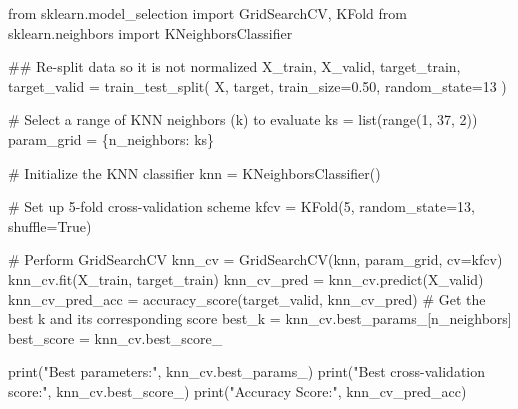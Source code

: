 \documentclass[
  11pt,
  letterpaper,
  DIV=11,
  numbers=noendperiod]{scrartcl}
\newenvironment{Shaded}{\begin{snugshade}}{\end{snugshade}}
\newcommand{\BuiltInTok}[1]{\textcolor[rgb]{0.00,0.23,0.31}{#1}}
\newcommand{\CommentTok}[1]{\textcolor[rgb]{0.37,0.37,0.37}{#1}}
\newcommand{\DecValTok}[1]{\textcolor[rgb]{0.68,0.00,0.00}{#1}}
\newcommand{\FloatTok}[1]{\textcolor[rgb]{0.68,0.00,0.00}{#1}}
\newcommand{\ImportTok}[1]{\textcolor[rgb]{0.00,0.46,0.62}{#1}}
\newcommand{\NormalTok}[1]{\textcolor[rgb]{0.00,0.23,0.31}{#1}}
\newcommand{\OperatorTok}[1]{\textcolor[rgb]{0.37,0.37,0.37}{#1}}
\newcommand{\StringTok}[1]{\textcolor[rgb]{0.13,0.47,0.30}{#1}}
\newcommand{\VariableTok}[1]{\textcolor[rgb]{0.07,0.07,0.07}{#1}}
\begin{document}
\begin{Shaded}
\begin{Highlighting}[]
\ImportTok{from}\NormalTok{ sklearn.model\_selection }\ImportTok{import}\NormalTok{ GridSearchCV, KFold}
\ImportTok{from}\NormalTok{ sklearn.neighbors }\ImportTok{import}\NormalTok{ KNeighborsClassifier}

\CommentTok{\#\# Re{-}split data so it is not normalized }
\NormalTok{X\_train, X\_valid, target\_train, target\_valid }\OperatorTok{=}\NormalTok{ train\_test\_split(}
\NormalTok{X, target, train\_size}\OperatorTok{=}\FloatTok{0.50}\NormalTok{, random\_state}\OperatorTok{=}\DecValTok{13}
\NormalTok{)}


\CommentTok{\# Select a range of KNN neighbors (k) to evaluate}
\NormalTok{ks }\OperatorTok{=} \BuiltInTok{list}\NormalTok{(}\BuiltInTok{range}\NormalTok{(}\DecValTok{1}\NormalTok{, }\DecValTok{37}\NormalTok{, }\DecValTok{2}\NormalTok{))}
\NormalTok{param\_grid }\OperatorTok{=}\NormalTok{ \{}\StringTok{\textquotesingle{}n\_neighbors\textquotesingle{}}\NormalTok{: ks\}}

\CommentTok{\# Initialize the KNN classifier}
\NormalTok{knn }\OperatorTok{=}\NormalTok{ KNeighborsClassifier()}

\CommentTok{\# Set up 5{-}fold cross{-}validation scheme}
\NormalTok{kfcv }\OperatorTok{=}\NormalTok{ KFold(}\DecValTok{5}\NormalTok{, random\_state}\OperatorTok{=}\DecValTok{13}\NormalTok{, shuffle}\OperatorTok{=}\VariableTok{True}\NormalTok{)}

\CommentTok{\# Perform GridSearchCV}
\NormalTok{knn\_cv }\OperatorTok{=}\NormalTok{ GridSearchCV(knn, param\_grid, cv}\OperatorTok{=}\NormalTok{kfcv)}
\NormalTok{knn\_cv.fit(X\_train, target\_train)}
\NormalTok{knn\_cv\_pred }\OperatorTok{=}\NormalTok{ knn\_cv.predict(X\_valid)}
\NormalTok{knn\_cv\_pred\_acc }\OperatorTok{=}\NormalTok{ accuracy\_score(target\_valid, knn\_cv\_pred)}
\CommentTok{\# Get the best k and its corresponding score}
\NormalTok{best\_k }\OperatorTok{=}\NormalTok{ knn\_cv.best\_params\_[}\StringTok{\textquotesingle{}n\_neighbors\textquotesingle{}}\NormalTok{]}
\NormalTok{best\_score }\OperatorTok{=}\NormalTok{ knn\_cv.best\_score\_}

\BuiltInTok{print}\NormalTok{(}\StringTok{"Best parameters:"}\NormalTok{, knn\_cv.best\_params\_)}
\BuiltInTok{print}\NormalTok{(}\StringTok{"Best cross{-}validation score:"}\NormalTok{, knn\_cv.best\_score\_)}
\BuiltInTok{print}\NormalTok{(}\StringTok{"Accuracy Score:"}\NormalTok{, knn\_cv\_pred\_acc)}





\end{Highlighting}
\end{Shaded}
\end{document}
